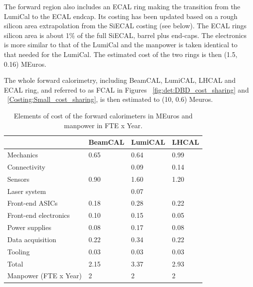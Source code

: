 The forward region also includes an ECAL ring making the transition from the LumiCal to the ECAL endcap. Its costing has been updated based on a rough silicon area extrapolation from the SiECAL costing (see below). The ECAL rings silicon area is about  1\% of the full SiECAL, barrel plus end-caps. The electronics is more similar to that of the LumiCal and the manpower is taken identical to that needed for the LumiCal.  The estimated cost of the two rings is then (1.5, 0.16) MEuros.  

The whole forward calorimetry, including BeamCAL, LumiCAL, LHCAL and ECAL ring, and referred to as FCAL in Figures ~\ref{fig:det:DBD_cost_sharing} and ~\ref{Costing:Small_cost_sharing}, is then estimated to (10, 0.6) Meuros.


 \begin{table}\hspace*{-0cm}\small 
\begin{tabular}[h!]{ l p{0.2\hsize}p{0.2\hsize}p{0.2\hsize} }
\toprule
& BeamCAL & LumiCAL & LHCAL \\
\midrule
Mechanics              & 0.65   & 0.64   & 0.99   \\
Connectivity           &        & 0.09   & 0.14   \\
Sensors                & 0.90   & 1.60   & 1.20  \\
Laser system           &        & 0.07   &       \\
Front-end ASICs        & 0.18   & 0.28   & 0.22   \\
Front-end electronics  & 0.10   & 0.15   & 0.05  \\
Power supplies         & 0.08   & 0.17   & 0.08    \\
Data acquisition       & 0.22   & 0.34   & 0.22  \\
Tooling                & 0.03   & 0.03   & 0.03   \\
\midrule
Total                  & 2.15  & 3.37   & 2.93  \\
\midrule
Manpower (FTE x Year)  &2       &2       & 2 \\
\bottomrule
\end{tabular}
\caption{\label{FCals_summary}Elements of cost of the forward calorimeters in MEuros and manpower in FTE x Year.}
\end{table}

